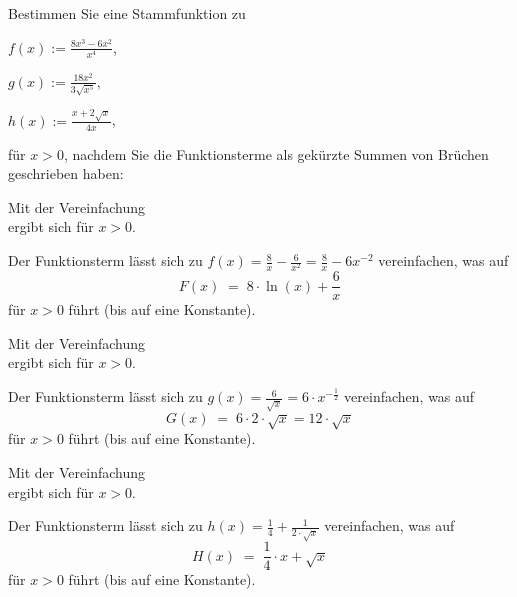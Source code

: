 \begin{MExercises}
\begin{MExercise}
Bestimmen Sie eine Stammfunktion zu
\begin{MExerciseItems}
\item $\displaystyle f(x) := \frac{8 x^3 - 6 x^2}{x^4}$,
\item $\displaystyle g(x) := \frac{18 x^2}{3 \sqrt{x^5}}$,
\item $\displaystyle h(x) := \frac{x + 2 \sqrt{x}}{4x}$,
\end{MExerciseItems}
für $x > 0$, nachdem Sie die Funktionsterme als gekürzte Summen von Brüchen
geschrieben haben:

\begin{MExerciseItems}
\item{Mit der Vereinfachung \\ 
ergibt sich  für $x>0$.\\
\begin{MHint}{\iSolution}
Der Funktionsterm lässt sich zu 
$f(x) = \frac{8}{x} - \frac{6}{x^2} = \frac{8}{x} - 6 x^{-2}$ vereinfachen,
was auf 
\[
F(x) \;=\; 8 \cdot \ln(x) + \frac{6}{x} %
\]
für $x > 0$ führt (bis auf eine Konstante).
\end{MHint}
}
\item{Mit der Vereinfachung \\
ergibt sich  für $x > 0$.\\
\begin{MHint}{\iSolution}
Der Funktionsterm lässt sich zu %
$g(x) = \frac{6}{\sqrt{x}} = 6 \cdot x^{-\frac{1}{2}}$ %
vereinfachen, was auf 
\[
G(x) \;=\; 6 \cdot 2 \cdot \sqrt{x} = 12 \cdot \sqrt{x} %
\]
für $x > 0$ führt (bis auf eine Konstante).
\end{MHint}
}
\item{Mit der Vereinfachung \\
ergibt sich  für $x > 0$.\\
\begin{MHint}{\iSolution}
Der Funktionsterm lässt sich zu %
$h(x)=\frac{1}{4} + \frac{1}{2 \cdot \sqrt{x}}$ 
vereinfachen, was auf 
\[
H(x) \;=\; \frac{1}{4} \cdot x + \sqrt{x} %
\]
für $x > 0$ führt (bis auf eine Konstante).
\end{MHint}
}
\end{MExerciseItems}
\end{MExercise}



\end{MExercises}
